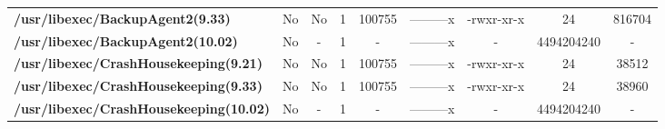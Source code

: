\begin{center}
{\begin{tabular}{|>{\bfseries} l | C | C | C | C | C | C | C | C |}
					/usr/libexec/BackupAgent2(9.33) & No & No & \color{green}1 & \color{red}100755 & \color{green}---------x & \color{red}-rwxr-xr-x & \color{green}24 & \color{red}816704\\ 
					/usr/libexec/BackupAgent2(10.02) & No & - & 1 & - & ---------x & - & 4494204240 & -\\ 
					/usr/libexec/CrashHousekeeping(9.21) & No & No & \color{green}1 & \color{red}100755 & \color{green}---------x & \color{red}-rwxr-xr-x & \color{green}24 & \color{red}38512\\ 
					/usr/libexec/CrashHousekeeping(9.33) & No & No & \color{green}1 & \color{red}100755 & \color{green}---------x & \color{red}-rwxr-xr-x & \color{green}24 & \color{red}38960\\ 
					/usr/libexec/CrashHousekeeping(10.02) & No & - & 1 & - & ---------x & - & 4494204240 & -\\ 

			\end{tabular}
		}
	\end{center}



